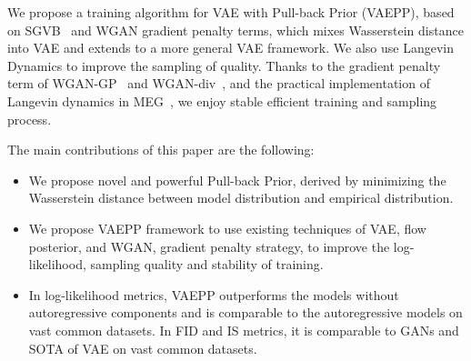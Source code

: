 We propose a training algorithm for VAE with Pull-back Prior (VAEPP), based on SGVB~\cite{kingma2014auto} and WGAN gradient penalty terms, which mixes Wasserstein distance into VAE and extends to a more general VAE framework. We also use Langevin Dynamics to improve the sampling of quality. 
Thanks to the gradient penalty term of WGAN-GP~\cite{gulrajani2017improved} and WGAN-div~\cite{wu2018wasserstein}, and the practical implementation of Langevin dynamics in MEG~\cite{kumar2019maximum}, we enjoy stable efficient training and sampling process. 

The main contributions of this paper are the following:
\begin{itemize}
	\item We propose novel and powerful Pull-back Prior, derived by minimizing the Wasserstein distance between model distribution and empirical distribution. 
	\item We propose VAEPP framework to use existing techniques of VAE, \EG flow posterior, and WGAN, \EG gradient penalty strategy, to improve the log-likelihood, sampling quality and stability of training. 
	\item In log-likelihood metrics, VAEPP outperforms the models without autoregressive components and is comparable to the autoregressive models on vast common datasets. In FID and IS metrics, it is comparable to GANs and SOTA of VAE on vast common datasets. 
\end{itemize}
